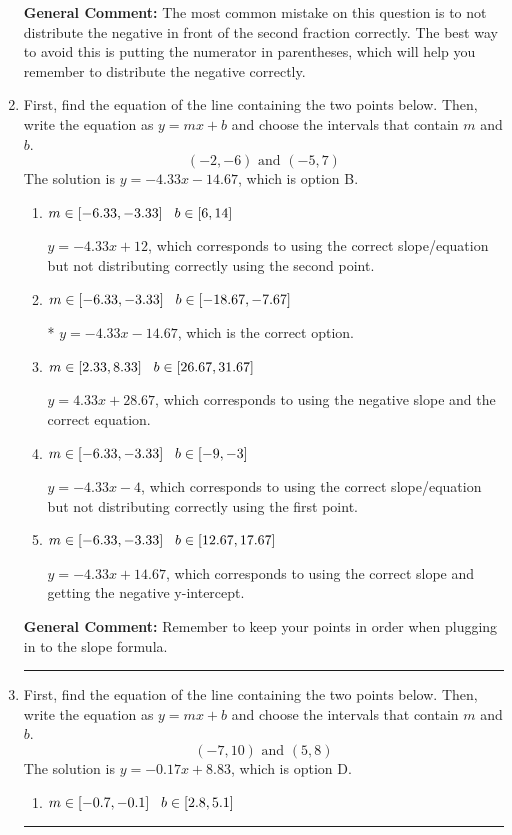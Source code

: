 \documentclass{extbook}[14pt]
\newcommand{\litem}[1]{\item #1

\rule{\textwidth}{0.4pt}}
\begin{document}
\begin{enumerate}
{\textbf{General Comment:} The most common mistake on this question is to not distribute the negative in front of the second fraction correctly. The best way to avoid this is putting the numerator in parentheses, which will help you remember to distribute the negative correctly.
}
\litem{
First, find the equation of the line containing the two points below. Then, write the equation as $ y=mx+b $ and choose the intervals that contain $m$ and $b$.
\[ (-2, -6) \text{ and } (-5, 7) \]The solution is \( y = -4.33x -14.67 \), which is option B.\begin{enumerate}[label=\Alph*.]
\item \( m \in [-6.33, -3.33] \hspace*{3mm} b \in [6, 14] \)

 $y = -4.33x + 12$, which corresponds to using the correct slope/equation but not distributing correctly using the second point.
\item \( m \in [-6.33, -3.33] \hspace*{3mm} b \in [-18.67, -7.67] \)

* $y = -4.33x -14.67$, which is the correct option.
\item \( m \in [2.33, 8.33] \hspace*{3mm} b \in [26.67, 31.67] \)

 $y = 4.33x + 28.67$, which corresponds to using the negative slope and the correct equation.
\item \( m \in [-6.33, -3.33] \hspace*{3mm} b \in [-9, -3] \)

 $y = -4.33x -4$, which corresponds to using the correct slope/equation but not distributing correctly using the first point.
\item \( m \in [-6.33, -3.33] \hspace*{3mm} b \in [12.67, 17.67] \)

 $y = -4.33x + 14.67$, which corresponds to using the correct slope and getting the negative y-intercept.
\end{enumerate}

\textbf{General Comment:} Remember to keep your points in order when plugging in to the slope formula.
}
\litem{
First, find the equation of the line containing the two points below. Then, write the equation as $ y=mx+b $ and choose the intervals that contain $m$ and $b$.
\[ (-7, 10) \text{ and } (5, 8) \]The solution is \( y = -0.17x + 8.83 \), which is option D.\begin{enumerate}[label=\Alph*.]
\item \( m \in [-0.7, -0.1] \hspace*{3mm} b \in [2.8, 5.1] \)


\end{enumerate}}
\end{enumerate}
\end{document}

